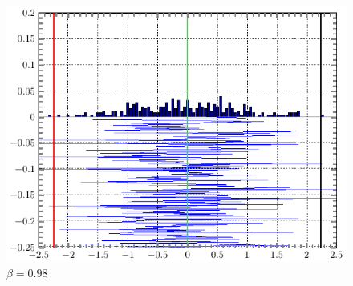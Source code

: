 \documentclass[a4paper,14pt]{extarticle}
\begin{document}
\begin{figure}[H]
\begin{minipage}{0.3\linewidth}
    \caption{$\beta =0.95$}
\end{minipage}
\begin{minipage}{0.3\linewidth}
    \centering
    \includegraphics[width=\linewidth]{fig/gist_n1_b98.pdf}
    \vspace{-1em}
    \caption{$\beta =0.98$}
\end{minipage}
\end{figure}
\end{document}
